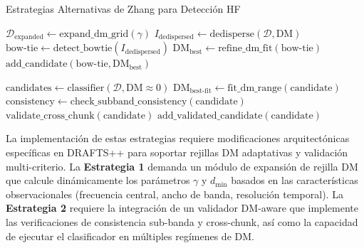 \begin{algorithm}[H]
\caption{Estrategias Alternativas de Zhang para Detección HF}
\label{alg:zhang-strategies}
\begin{algorithmic}[1]
    \State $\mathcal{D}_{\mathrm{expanded}} \leftarrow \text{expand\_dm\_grid}(\gamma)$
        \State $I_{\mathrm{dedispersed}} \leftarrow \text{dedisperse}(\mathcal{D}, \mathrm{DM})$
        \State $\text{bow-tie} \leftarrow \text{detect\_bowtie}(I_{\mathrm{dedispersed}})$
            \State $\text{DM}_{\text{best}} \leftarrow \text{refine\_dm\_fit}(\text{bow-tie})$
                \State $\text{add\_candidate}(\text{bow-tie}, \text{DM}_{\text{best}})$
            \EndIf
        \EndIf
    \EndFor
\EndFunction

    \State $\text{candidates} \leftarrow \text{classifier}(\mathcal{D}, \mathrm{DM} \approx 0)$
        \State $\text{DM}_{\text{best-fit}} \leftarrow \text{fit\_dm\_range}(\text{candidate})$
            \State $\text{consistency} \leftarrow \text{check\_subband\_consistency}(\text{candidate})$
                \State $\text{validate\_cross\_chunk}(\text{candidate})$
                \State $\text{add\_validated\_candidate}(\text{candidate})$
            \EndIf
        \EndIf
    \EndFor
\EndFunction
\end{algorithmic}
\end{algorithm}

La implementación de estas estrategias requiere modificaciones arquitectónicas específicas en DRAFTS++ para soportar rejillas DM adaptativas y validación multi-criterio. La \textbf{Estrategia 1} demanda un módulo de expansión de rejilla DM que calcule dinámicamente los parámetros $\gamma$ y $d_{\min}$ basados en las características observacionales (frecuencia central, ancho de banda, resolución temporal). La \textbf{Estrategia 2} requiere la integración de un validador DM-aware que implemente las verificaciones de consistencia sub-banda y cross-chunk, así como la capacidad de ejecutar el clasificador en múltiples regímenes de DM.

